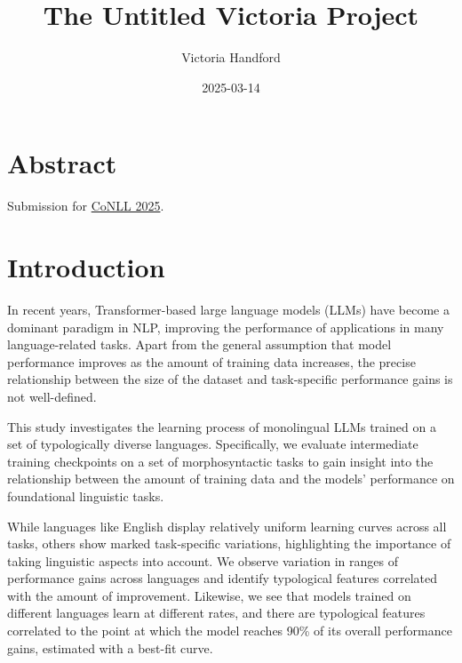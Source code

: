 \documentclass[
  letterpaper,
  DIV=11,
  numbers=noendperiod]{scrreprt}
\title{The Untitled Victoria Project}
\author{Victoria Handford}
\date{2025-03-14}
\renewcommand*\contentsname{Table of contents}
\newcommand\contentsname{Table of contents}
\begin{document}
\maketitle

\renewcommand*\contentsname{Table of contents}
{
\hypersetup{linkcolor=}
\setcounter{tocdepth}{2}
\tableofcontents
}


\chapter*{Abstract}\label{abstract}


Submission for \href{https://conll.org/}{CoNLL 2025}.


\chapter{Introduction}\label{introduction}

In recent years, Transformer-based large language models (LLMs) have
become a dominant paradigm in NLP, improving the performance of
applications in many language-related tasks. Apart from the general
assumption that model performance improves as the amount of training
data increases, the precise relationship between the size of the dataset
and task-specific performance gains is not well-defined.

This study investigates the learning process of monolingual LLMs trained
on a set of typologically diverse languages. Specifically, we evaluate
intermediate training checkpoints on a set of morphosyntactic tasks to
gain insight into the relationship between the amount of training data
and the models' performance on foundational linguistic tasks.

While languages like English display relatively uniform learning curves
across all tasks, others show marked task-specific variations,
highlighting the importance of taking linguistic aspects into account.
We observe variation in ranges of performance gains across languages and
identify typological features correlated with the amount of improvement.
Likewise, we see that models trained on different languages learn at
different rates, and there are typological features correlated to the
point at which the model reaches 90\% of its overall performance gains,
estimated with a best-fit curve.
\end{document}
